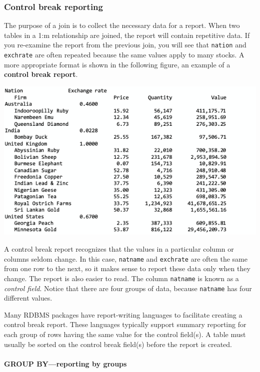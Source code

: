 \documentclass[
]{article}
\begin{document}
\hypertarget{control-break-reporting}{%
\subsubsection*{Control break reporting}\label{control-break-reporting}}

The purpose of a join is to collect the necessary data for a report.
When two tables in a 1:m relationship are joined, the report will
contain repetitive data. If you re-examine the report from the previous
join, you will see that \texttt{nation} and \texttt{exchrate} are often repeated
because the same values apply to many stocks. A more appropriate format
is shown in the following figure, an example of a \textbf{control break
report}.

\includegraphics{Figures/Chapter 4/cbr.png}

A control break report recognizes that the values in a particular column
or columns seldom change. In this case, \texttt{natname} and \texttt{exchrate} are
often the same from one row to the next, so it makes sense to report
these data only when they change. The report is also easier to read. The
column \texttt{natname} is known as a \emph{control field}. Notice that there are
four groups of data, because \texttt{natname} has four different values.

Many RDBMS packages have report-writing languages to facilitate creating
a control break report. These languages typically support summary
reporting for each group of rows having the same value for the control
field(s). A table must usually be sorted on the control break field(s)
before the report is created.

\hypertarget{group-byreporting-by-groups}{%
\paragraph*{GROUP BY---reporting by groups}\label{group-byreporting-by-groups}}
\end{document}
